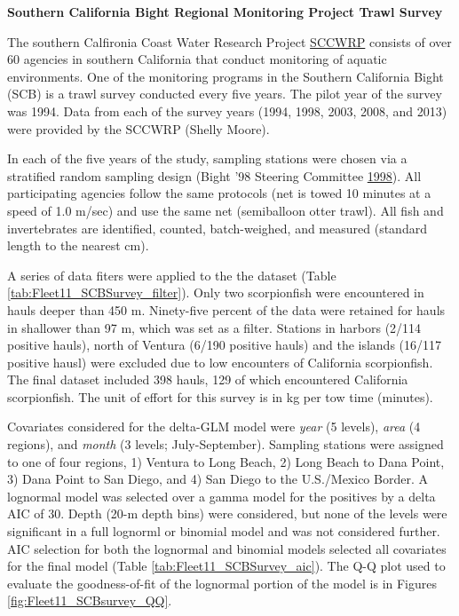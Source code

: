 \documentclass[12pt,]{article}
\begin{document}
\textbf{Southern California Bight Regional Monitoring Project Trawl
Survey}

The southern Calfironia Coast Water Research Project
\href{http://www.sccwrp.org/Homepage.aspx}{SCCWRP} consists of over 60
agencies in southern California that conduct monitoring of aquatic
environments. One of the monitoring programs in the Southern California
Bight (SCB) is a trawl survey conducted every five years. The pilot year
of the survey was 1994. Data from each of the survey years (1994, 1998,
2003, 2008, and 2013) were provided by the SCCWRP (Shelly Moore).

In each of the five years of the study, sampling stations were chosen
via a stratified random sampling design (Bight '98 Steering Committee
\protect\hyperlink{ref-Bight1998}{1998}). All participating agencies
follow the same protocols (net is towed 10 minutes at a speed of 1.0
m/sec) and use the same net (semiballoon otter trawl). All fish and
invertebrates are identified, counted, batch-weighed, and measured
(standard length to the nearest cm).

A series of data fiters were applied to the the dataset (Table
\ref{tab:Fleet11_SCBSurvey_filter}). Only two scorpionfish were
encountered in hauls deeper than 450 m. Ninety-five percent of the data
were retained for hauls in shallower than 97 m, which was set as a
filter. Stations in harbors (2/114 positive hauls), north of Ventura
(6/190 positive hauls) and the islands (16/117 positive hausl) were
excluded due to low encounters of California scorpionfish. The final
dataset included 398 hauls, 129 of which encountered California
scorpionfish. The unit of effort for this survey is in kg per tow time
(minutes).

Covariates considered for the delta-GLM model were \emph{year} (5
levels), \emph{area} (4 regions), and \emph{month} (3 levels;
July-September). Sampling stations were assigned to one of four regions,
1) Ventura to Long Beach, 2) Long Beach to Dana Point, 3) Dana Point to
San Diego, and 4) San Diego to the U.S./Mexico Border. A lognormal model
was selected over a gamma model for the positives by a delta AIC of 30.
Depth (20-m depth bins) were considered, but none of the levels were
significant in a full lognorml or binomial model and was not considered
further. AIC selection for both the lognormal and binomial models
selected all covariates for the final model (Table
\ref{tab:Fleet11_SCBSurvey_aic}). The Q-Q plot used to evaluate the
goodness-of-fit of the lognormal portion of the model is in Figures
\ref{fig:Fleet11_SCBsurvey_QQ}.
\end{document}
